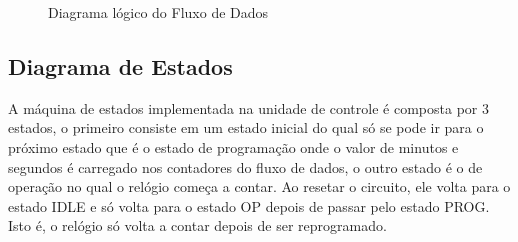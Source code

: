\documentclass[a4,12pt]{horizon-theme}
\begin{document}
    \begin{figure}[!ht]
        \centering
        \caption{Diagrama lógico do Fluxo de Dados}
        \label{fig:logico_fd}
    \end{figure}


\newpage
\subsection{Diagrama de Estados}
A máquina de estados implementada na unidade de controle é composta por 3 estados, o primeiro consiste em um estado inicial do qual só se pode ir para o próximo estado que é o estado de programação onde o valor de minutos e segundos é carregado nos contadores do fluxo de dados, o outro estado é o de operação no qual o relógio começa a contar. Ao resetar o circuito, ele volta para o estado IDLE e só volta para o estado OP depois de passar pelo estado PROG. Isto é, o relógio só volta a contar depois de ser reprogramado.
\end{document}
